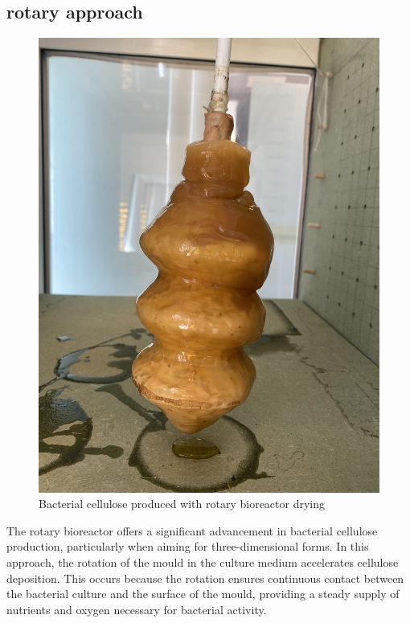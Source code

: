 \subsection{rotary approach}


\begin{figure}[h]
    \centering
    \includegraphics{images/IMG_2419.jpg}
    \caption{Bacterial cellulose produced with rotary bioreactor drying}
    \label{fig:rotanside}
\end{figure} 

The rotary bioreactor offers a significant advancement in bacterial cellulose production, particularly when aiming for three-dimensional forms. In this approach, the rotation of the mould in the culture medium accelerates cellulose deposition. This occurs because the rotation ensures continuous contact between the bacterial culture and the surface of the mould, providing a steady supply of nutrients and oxygen necessary for bacterial activity.

